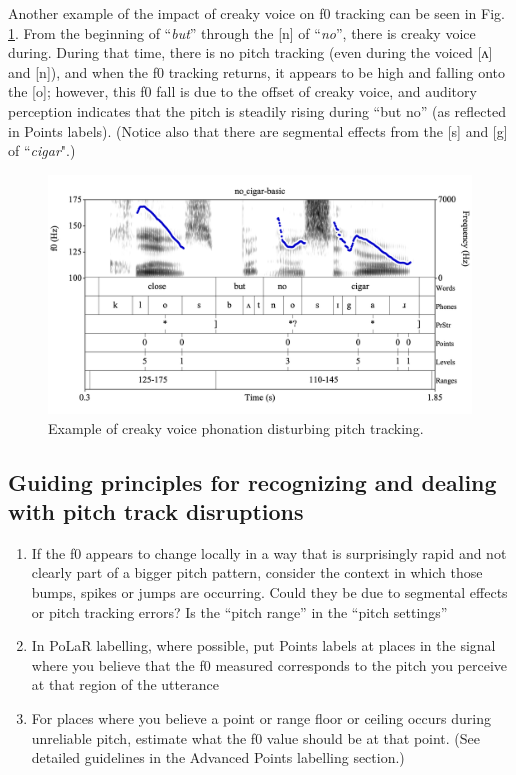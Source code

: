\documentclass[11pt, twoside]{memoir}
\def\langtext#1{\textit{#1}}
\begin{document}
Another example of the impact of creaky voice on f0 tracking can be seen in Fig. \ref{fig:no_cigar f0-tracking}. From the beginning of “\langtext{but}” through the [n] of “\langtext{no}”, there is creaky voice during. During that time, there is no pitch tracking (even during the voiced [ʌ] and [n]), and when the f0 tracking returns, it appears to be high and falling onto the [o]; however, this f0 fall is due to the offset of creaky voice, and auditory perception indicates  that the pitch is steadily rising during “but no” (as reflected in Points labels). (Notice also that there are segmental effects from the [s] and [g] of “\langtext{cigar}".)
\begin{figure}[H]
\centering
\includegraphics[width=.875\linewidth]{Levels-no_cigar-basic.png}
\caption{Example of creaky voice phonation disturbing pitch tracking.
\label{fig:no_cigar f0-tracking}
}
\end{figure}
\subsection{Guiding principles for recognizing and dealing with pitch track disruptions}\label{sec:guiding-principles-for-recognizing-and-dealing-with-pitch-track-disruptions}
\begin{enumerate} \def\labelenumi{\arabic{enumi}.}
\item If the f0 appears to change locally in a way that is surprisingly rapid and not clearly part of a bigger pitch pattern, consider the context in which those bumps, spikes or jumps are occurring. Could they be due to segmental effects or pitch tracking errors? Is the “pitch range” in the “pitch settings”
\item In PoLaR labelling, where possible, put Points labels at places in the signal where you believe that the f0 measured corresponds to the pitch you perceive at that region of the utterance
\item For places where you believe a point or range floor or ceiling occurs during unreliable pitch, estimate what the f0 value should be at that point. (See detailed guidelines in the Advanced Points labelling section.) 
\end{enumerate}


\end{document}
